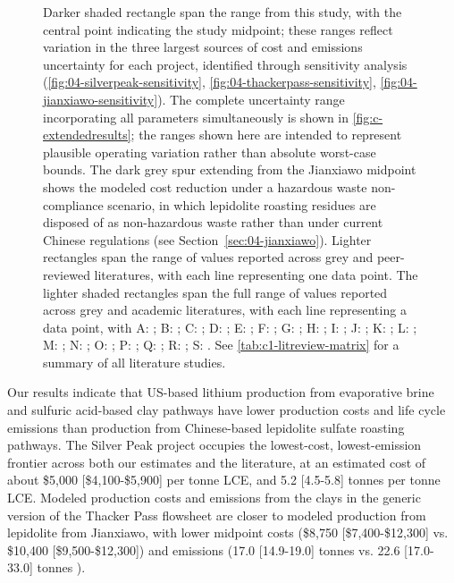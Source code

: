 \begin{figure}[!h]
    \small{Darker shaded rectangle span the range from this study, with the central point indicating the study midpoint; these ranges reflect variation in the three largest sources of cost and emissions uncertainty for each project, identified through sensitivity analysis (\ref{fig:04-silverpeak-sensitivity}, \ref{fig:04-thackerpass-sensitivity}, \ref{fig:04-jianxiawo-sensitivity}). The complete uncertainty range incorporating all parameters simultaneously is shown in \ref{fig:c-extendedresults}; the ranges shown here are intended to represent plausible operating variation rather than absolute worst-case bounds. The dark grey spur extending from the Jianxiawo midpoint shows the modeled cost reduction under a hazardous waste non-compliance scenario, in which lepidolite roasting residues are disposed of as non-hazardous waste rather than under current Chinese regulations (see Section~\ref{sec:04-jianxiawo}). Lighter rectangles span the range of values reported across grey and peer-reviewed literatures, with each line representing one data point. The lighter shaded rectangles span the full range of values reported across grey and academic literatures, with each line representing a data point, with A: \citet{srkconsultingSECTechnicalReport2023a}; B: \citet{sgscanadaincSK1300Technical2024}; C: \citet{ambroseUnderstandingFutureLithium2020a}; D: \citet{mousavinezhadNextLithiumBoom2025}; E: \citet{flemingLongrunAvailabilityMineral2024}; F: \citet{wesselkaemperOptimizationProcessingCosts2025}; G: \citet{chenLithiumSpotPrice2023}; H: \citet{atkinsonLithiumPriceReversion2023}; I: \citet{liuChinaLithiumBoom2024}; J: \citet{liLithiumWeaknessPushes2024}; K: \citet{sunRobustAssessmentsLithium2025}; L: \citet{manjongLifeCycleModelling2021}; M: \citet{ambroseUnderstandingFutureLithium2020b}; N: \citet{schenkerCurrentFutureImpacts2025}; O: \citet{khakmardanLifeCycleAssessment2024}; P: \citet{iyerLifecycleAnalysisLithium2024}; Q: \citet{royLithiumClayAssessing2024}; R: \citet{liuCarbonFootprintBatteryGrade2025}; S: \citet{wangLifeCycleEnvironmental2026}. See \ref{tab:c1-litreview-matrix} for a summary of all literature studies.}
    \label{fig:04-costemissions}
\end{figure}

Our results indicate that US-based lithium production from evaporative brine and sulfuric acid-based clay pathways have lower production costs and life cycle emissions than production from Chinese-based lepidolite sulfate roasting pathways. The Silver Peak project occupies the lowest-cost, lowest-emission frontier across both our estimates and the literature, at an estimated cost of about \$5,000 [\$4,100-\$5,900] per tonne LCE, and 5.2 [4.5-5.8] tonnes  per tonne LCE. Modeled production costs and emissions from the clays in the generic version of the Thacker Pass flowsheet are closer to modeled production from lepidolite from Jianxiawo, with lower midpoint costs (\$8,750 [\$7,400-\$12,300] vs. \$10,400 [\$9,500-\$12,300]) and emissions (17.0 [14.9-19.0] tonnes  vs. 22.6 [17.0-33.0] tonnes ). 

